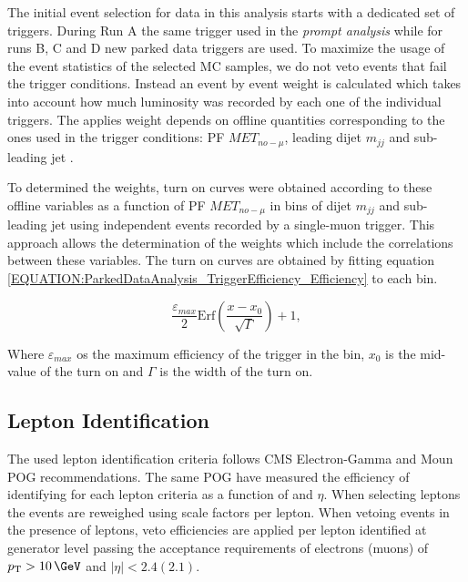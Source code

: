 
The initial event selection for data in this analysis starts with a dedicated set of triggers. During Run A the same trigger used in the \textit{prompt analysis} while for runs B, C and D new parked data triggers are used. To maximize the usage of the event statistics of the selected \gls{MC} samples, we do not veto events that fail the trigger conditions. Instead an event by event weight is calculated which takes into account how much luminosity was recorded by each one of the individual triggers. The applies weight depends on offline quantities corresponding to the ones used in the trigger conditions: \gls{PF} $MET_{no-\mu}$, leading dijet $m_{jj}$ and sub-leading jet \pt. 

To determined the weights, turn on curves were obtained according to these offline variables as a function of \gls{PF} $MET_{no-\mu}$ in bins of dijet $m_{jj}$ and sub-leading jet \pt using independent events recorded by a single-muon trigger. This approach allows the determination of the weights which include the correlations between these variables. The turn on curves are obtained by fitting equation \ref{EQUATION:ParkedDataAnalysis_TriggerEfficiency_Efficiency} to each bin.

\begin{equation}
\frac{\varepsilon_{max}}{2}\text{Erf}\left(\frac{x-x_{0}}{\sqrt{\Gamma}}\right)+1,
\label{EQUATION:ParkedDataAnalysis_TriggerEfficiency_Efficiency} 
\end{equation}

Where $\varepsilon_{max}$ os the maximum efficiency of the trigger in the bin, $x_{0}$ is the mid-value of the turn on and $\Gamma$ is the width of the turn on.

\subsection{Lepton Identification}


The used lepton identification criteria follows \gls{CMS} Electron-Gamma and Moun \gls{POG} recommendations. The same \gls{POG} have measured the efficiency of identifying for each lepton criteria as a function of \pt and $\eta$. When selecting leptons the events are reweighed using scale factors per lepton. When vetoing events in the presence of leptons, veto efficiencies are applied per lepton identified at generator level passing the acceptance requirements of electrons (muons) of $\pt>10\,\GeV$ and $|\eta|<2.4(2.1)$.

